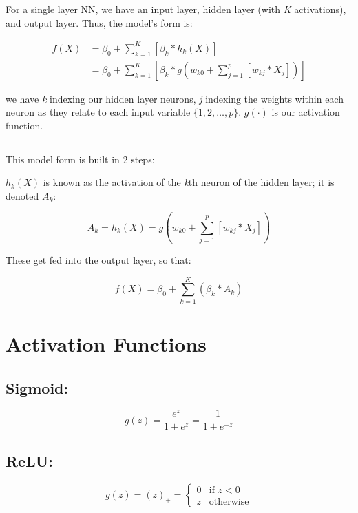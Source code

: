 \documentclass[
]{book}
\begin{document}
For a single layer NN, we have an input layer, hidden layer (with \emph{K} activations), and output layer. Thus, the model's form is:

\[
\begin{aligned}
f(X) &= \beta_0 + \sum_{k = 1}^K \left[\beta_k * h_k(X)\right] \\
&= \beta_0 + \sum_{k = 1}^K \left[\beta_k * g\left(w_{k0} + \sum_{j = 1}^p[w_{kj} * X_j]\right)\right]
\end{aligned}
\]

we have \emph{k} indexing our hidden layer neurons, \emph{j} indexing the weights within each neuron as they relate to each input variable \(\{1, 2, \dots, p\}\). \(g(\cdot)\) is our activation function.

\begin{center}\rule{0.5\linewidth}{0.5pt}\end{center}

This model form is built in 2 steps:

\(h_k(X)\) is known as the activation of the \emph{k}th neuron of the hidden layer; it is denoted \(A_k\):

\[A_k = h_k(X) = g\left(w_{k0} + \sum_{j = 1}^p[w_{kj} * X_j]\right)\]

These get fed into the output layer, so that:

\[f(X) = \beta_0 + \sum_{k = 1}^K (\beta_k * A_k)\]

\hypertarget{activation-functions}{%
\section{Activation Functions}\label{activation-functions}}

\hypertarget{sigmoid}{%
\subsection{Sigmoid:}\label{sigmoid}}

\[g(z) = \frac{e^z}{1 + e^z} = \frac{1}{1 + e^{-z}}\]

\hypertarget{relu}{%
\subsection{ReLU:}\label{relu}}

\[
g(z) = (z)_+ =
\begin{cases} 
0 & \text{if } z < 0 \\
z & \text{otherwise}
\end{cases}
\]
\end{document}
